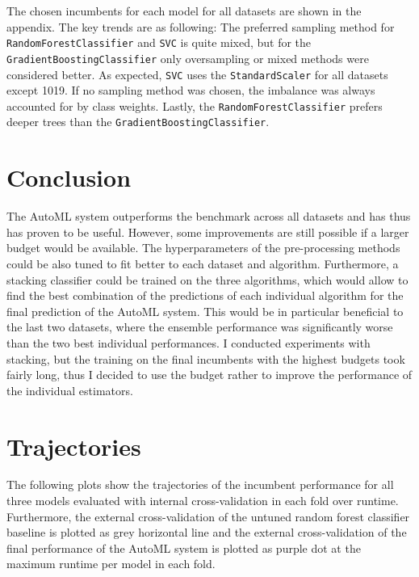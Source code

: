 \documentclass[11pt]{article}
\begin{document}
The chosen incumbents for each model for all datasets are shown in the appendix. The key trends are as following: The preferred sampling method for \texttt{RandomForestClassifier} and \texttt{SVC} is quite mixed, but for the \texttt{GradientBoostingClassifier} only oversampling or mixed methods were considered better. As expected, \texttt{SVC} uses the \texttt{StandardScaler} for all datasets except 1019. If no sampling method was chosen, the imbalance was always accounted for by class weights. Lastly, the \texttt{RandomForestClassifier} prefers deeper trees than the \texttt{GradientBoostingClassifier}. \\

\section{Conclusion}

The AutoML system outperforms the benchmark across all datasets and has thus has proven to be useful. However, some improvements are still possible if a larger budget would be available. The hyperparameters of the pre-processing methods could be also tuned to fit better to each dataset and algorithm. Furthermore, a stacking classifier could be trained on the three algorithms, which would allow to find the best combination of the predictions of each individual algorithm for the final prediction of the AutoML system. This would be in particular beneficial to the last two datasets, where the ensemble performance was significantly worse than the two best individual performances. I conducted experiments with stacking, but the training on the final incumbents with the highest budgets took fairly long, thus I decided to use the budget rather to improve the performance of the individual estimators.





\newpage
\appendix

\section{Trajectories}

The following plots show the trajectories of the incumbent performance for all three models evaluated with internal cross-validation in each fold over runtime. Furthermore, the external cross-validation of the untuned random forest classifier baseline is plotted as grey horizontal line and the external cross-validation of the final performance of the AutoML system is plotted as purple dot at the maximum runtime per model in each fold.
\end{document}
